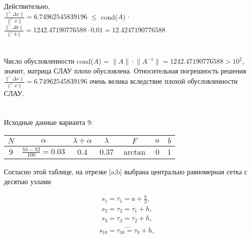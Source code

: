 \documentclass[a4paper, 12pt]{extarticle}
\begin{document}
\begin{spacing}{1.5}
Действительно, \\
$\frac{\lVert ^> \Delta x \rVert}{\lVert ^>x \rVert} = 6.74962545839196$ $\leq$ cond($A$) $\cdot$  $\frac{\lVert ^> \Delta b \rVert}{\lVert ^>b \rVert} = 1242.47190776588 \cdot 0.01 = 12.4247190776588$
\end{spacing}

\section*{}

\begin{spacing}{1.5}
Число обусловленности cond($A$) = $\lVert A \rVert \cdot \lVert A^{-1} \rVert = 1242.47190776588 > 10^2$, значит, матрица СЛАУ плохо обусловлена. 
Относительная погрешность решения $\frac{\lVert ^> \Delta x \rVert}{\lVert ^>x \rVert} = 6.74962545839196$ очень велика вследствие плохой обусловленности СЛАУ.
\end{spacing}

\section*{}

Исходные данные варианта 9: \\


\renewcommand{\arraystretch}{2} %

\begin{table}[h]
    \centering
    \begin{tabular}{|c|c|c|c|c|c|c|}
        \hline
        $N$ & $\alpha$ & $\lambda + \alpha$ & $\lambda$ & $F$ & $a$ & $b$ \\
        \hline
        $9$ & $\frac{55 - 52}{100} = 0.03$ & $0.4$ & $0.37$ & $\arctan$ & $0$ & $1$ \\
        \hline
    \end{tabular}
\end{table}

Согласно этой таблице, на отрезке [a;b] выбрана центрально равномерная сетка с десятью узлами

\begin{align*}
    s_1 = \tau_1 = a + \frac{h}{2}, \\ 
    s_2 = \tau_2 = \tau_1 + h, \\
    s_3 = \tau_3 = \tau_2 + h, \\ 
\end{align*}
\vspace{-3\baselineskip}
\begin{equation*}
    \dots
\end{equation*}
\vspace{-1\baselineskip}
\begin{equation*}
    s_{10} = \tau_{10} = \tau_9 + h, 
\end{equation*}
\end{document}
